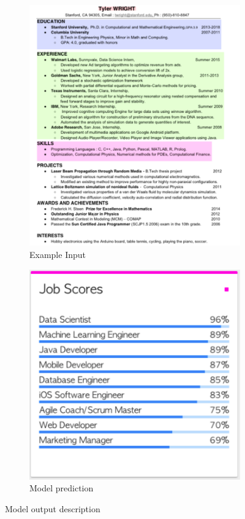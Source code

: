 \documentclass[11pt,letterpaper]{article}
\begin{document}
\begin{figure}[h!]
	\centering
	\begin{subfigure}[b]{0.4\linewidth}
		\includegraphics[width=\linewidth]{images/resume.png}
		\caption{Example Input}
	\end{subfigure}
	\begin{subfigure}[b]{0.4\linewidth}
		\includegraphics[width=\linewidth]{images/job_title.png}
		\caption{Model prediction}
	\end{subfigure}
	\caption{Model output description}
	\label{fig:coffee}
\end{figure}
\end{document}
